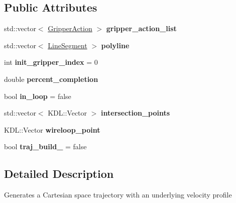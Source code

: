 \subsection*{Public Attributes}
\begin{DoxyCompactItemize}
\item 
\mbox{\label{class_trajectory_generator_a95febf555c35715078eab32e8d6dc414}} 
std\+::vector$<$ \hyperlink{struct_gripper_action}{Gripper\+Action} $>$ {\bfseries gripper\+\_\+action\+\_\+list}
\item 
\mbox{\label{class_trajectory_generator_ae61e04cc3c1fca3944ab866864a726cf}} 
std\+::vector$<$ \hyperlink{struct_line_segment}{Line\+Segment} $>$ {\bfseries polyline}
\item 
\mbox{\label{class_trajectory_generator_a6a2b55f8641011402979827c3ab69329}} 
int {\bfseries init\+\_\+gripper\+\_\+index} = 0
\item 
\mbox{\label{class_trajectory_generator_a75393b2da5bdc8ab1adfd2203c923bd2}} 
double {\bfseries percent\+\_\+completion}
\item 
\mbox{\label{class_trajectory_generator_a4beef63e7d87756755f4fc86e4fc70af}} 
bool {\bfseries in\+\_\+loop} = false
\item 
\mbox{\label{class_trajectory_generator_a027489beefdbc3d6458fd8c4f1d584d4}} 
std\+::vector$<$ K\+D\+L\+::\+Vector $>$ {\bfseries intersection\+\_\+points}
\item 
\mbox{\label{class_trajectory_generator_a3e06a6ddb77aeacb3827b7bbd225ca9a}} 
K\+D\+L\+::\+Vector {\bfseries wireloop\+\_\+point}
\item 
\mbox{\label{class_trajectory_generator_a9542635f7c67d4a76c6df05987fe0f89}} 
bool {\bfseries traj\+\_\+build\+\_\+} = false
\end{DoxyCompactItemize}


\subsection{Detailed Description}
Generates a Cartesian space trajectory with an underlying velocity profile 

